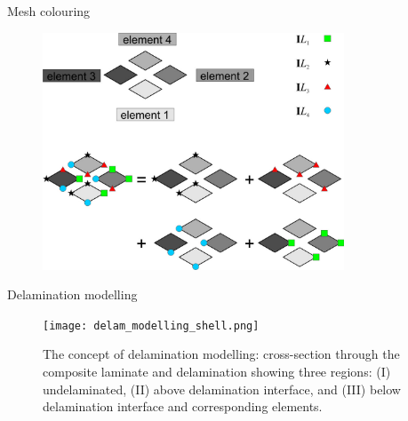 \documentclass[10pt]{beamer} %
\begin{document}
\begin{frame}{Mesh colouring}
	\begin{figure}
		\centering
			\includegraphics[width=0.8\textwidth]{beamer_figs/mesh_colouring_scheme4.jpg}	
			\label{fig:mesh_colouring}
	\end{figure}
\end{frame}
\begin{frame}[t]{Delamination modelling}
	\begin{figure} [h!]
		\centering
		\texttt{[image: delam\_modelling\_shell.png]}	
		\caption{The concept of delamination modelling: cross-section through the composite laminate and delamination showing three regions: (I) undelaminated, (II) above delamination interface, and (III) below delamination interface and corresponding elements.}
		\label{fig:delam_modelling_shell}
	\end{figure}
\end{frame}
\end{document}
